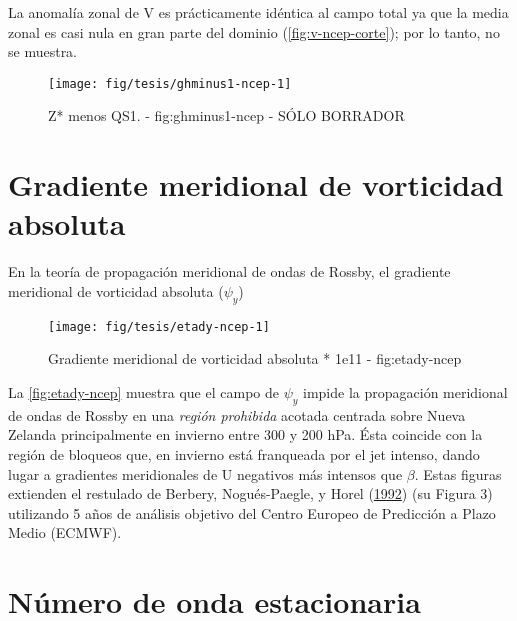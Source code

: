 \documentclass[spanish,a4paper]{book}
\begin{document}
La anomalía zonal de V es prácticamente idéntica al campo total ya que
la media zonal es casi nula en gran parte del dominio
(\autoref{fig:v-ncep-corte}); por lo tanto, no se muestra.

\begin{figure}

{\centering \texttt{[image: fig/tesis/ghminus1-ncep-1]} 

}

\caption{Z* menos QS1. - fig:ghminus1-ncep - SÓLO BORRADOR}\label{fig:ghminus1-ncep}
\end{figure}

\section{Gradiente meridional de vorticidad
absoluta}\label{gradiente-meridional-de-vorticidad-absoluta}

En la teoría de propagación meridional de ondas de Rossby, el gradiente
meridional de vorticidad absoluta (\(\psi_y\))

\begin{figure}

{\centering \texttt{[image: fig/tesis/etady-ncep-1]} 

}

\caption{Gradiente meridional de vorticidad absoluta * 1e11 - fig:etady-ncep}\label{fig:etady-ncep}
\end{figure}

La \autoref{fig:etady-ncep} muestra que el campo de \(\psi_y\) impide la
propagación meridional de ondas de Rossby en una \emph{región prohibida}
acotada centrada sobre Nueva Zelanda principalmente en invierno entre
300 y 200 hPa. Ésta coincide con la región de bloqueos que, en invierno
está franqueada por el jet intenso, dando lugar a gradientes
meridionales de U negativos más intensos que \(\beta\). Estas figuras
extienden el restulado de Berbery, Nogués-Paegle, y Horel
(\protect\hyperlink{ref-Berbery1992}{1992}) (su Figura 3) utilizando 5
años de análisis objetivo del Centro Europeo de Predicción a Plazo Medio
(ECMWF).

\section{Número de onda estacionaria}\label{numero-de-onda-estacionaria}
\end{document}
